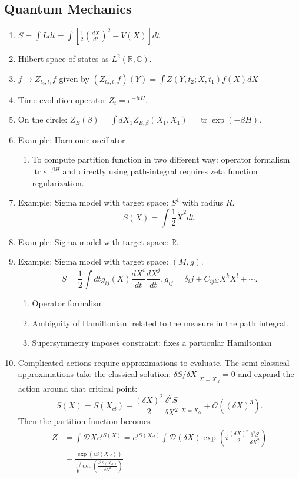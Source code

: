 \documentclass{report}
\theoremstyle{plain}
\theoremstyle{definition}
\theoremstyle{remark}
\newcommand{\bC}{\mathbb{C}}
\newcommand{\bR}{\mathbb{R}}
\newcommand{\mc}{\mathcal}
\newcommand{\FR}[2]{\frac{#1}{#2}}
\newcommand{\PFR}[2]{\left(\frac{#1}{#2}\right)}
\DeclareMathOperator{\Tr}{tr}
\begin{document}
\subsection{Quantum Mechanics}
\begin{enumerate}
    \item $S = \int Ldt = \int \left[\FR{1}{2}\PFR{dX}{dt}^2-V(X)\right]dt$
    \item Hilbert space of states as $L^2(\bR,\bC)$.
    \item $f\mapsto Z_{t_2;t_1}f$ given by $(Z_{t_2;t_1}f)(Y) = \int
        Z(Y,t_2;X,t_1)f(X)dX$
    \item Time evolution operator $Z_t = e^{-itH}$.
    \item On the circle: $Z_E(\beta) = \int dX_1 Z_{E,\beta}(X_1,X_1) =
        \Tr\exp(-\beta H)$.
    \item Example: Harmonic oscillator
        \begin{enumerate}
            \item To compute partition function in two different way: operator
                formalism $\Tr e^{-\beta H}$ and directly using
                path-integral requires zeta function regularization.
        \end{enumerate}
    \item Example: Sigma model with target space: $S^1$ with radius $R$.
        \[ S(X) = \int \FR{1}{2}\dot X^2 dt.\]
    \item Example: Sigma model with target space: $\bR$.
    \item Example: Sigma model with target space: $(M,g)$.
        \[ S = \FR{1}{2}\int dt g_{ij}(X) \FR{dX^i}{dt}\FR{dX^j}{dt},
        g_{ij} = \delta_ij + C_{ijkl}X^kX^l+\cdots.\]
        \begin{enumerate}
            \item Operator formalism
            \item Ambiguity of Hamiltonian: related to the measure in the
                path integral.
            \item Supersymmetry imposes constraint: fixes a particular
                Hamiltonian
        \end{enumerate}
    \item Complicated actions require approximations to evaluate. The
        semi-classical approximations take the classical solution: $\delta
        S/\delta X\bigr|_{X=X_{cl}} = 0$ and expand the action around that
        critical point:
        \[ S(X) = S(X_{cl}) + \FR{(\delta X)^2}{2}\FR{\delta^2 S}{\delta
        X^2}\biggr|_{X=X_{cl}} + \mc O((\delta X)^3).\]
        Then the partition function becomes
        \begin{align*}
            Z &= \int \mc DX e^{iS(X)}
= e^{iS(X_{cl})} \int \mc D(\delta X) \exp\left(i \FR{(\delta
X)^2}{2}\FR{\delta^2 S}{\delta X^2}\right)\\
            &= \FR{\exp\left(iS(X_{cl})\right)}{\sqrt{\det\PFR{\delta^2
                S(X_{cl})}{\delta X^2}}}
        \end{align*}
\end{enumerate}
\end{document}
